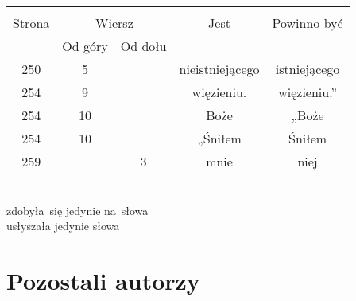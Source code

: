 \documentclass[a4paper,11pt]{article}
\begin{document}
\begin{center}
  \begin{tabular}{|c|c|c|c|c|}
    \hline
    & \multicolumn{2}{c|}{} & & \\
    Strona & \multicolumn{2}{c|}{Wiersz} & Jest
                              & Powinno być \\ \cline{2-3}
    & Od góry & Od dołu & & \\
    \hline
    250 &  5 & & nieistniejącego & istniejącego \\
    254 &  9 & & więzieniu. & więzieniu.'' \\
    254 & 10 & & Boże & „Boże \\
    254 & 10 & & „Śniłem & Śniłem \\
    259 & &  3 & mnie & niej \\
    \hline
  \end{tabular}

\end{center}





\noindent
{} \\
\Jest  zdobyła~się jedynie na~słowa \\
\Powin usłyszała jedynie słowa \\

\vspace{\spaceTwo}










\newpage
\section{Pozostali autorzy}

\vspace{\spaceTwo}
\end{document}

